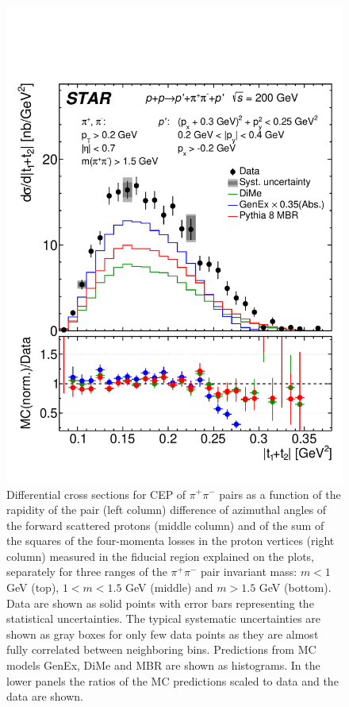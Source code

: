 \begin{figure}[h]
\hfill
\includegraphics[width=.31\textwidth,page=1]{graphics/physicsResults/Ratio_FinalResult_MandelstamTSum_pion_MassBin_3.pdf}
%
\caption{Differential cross sections for CEP of $\pi^+\pi^-$ pairs as a function of the rapidity of the pair (left column) difference of azimuthal angles of the forward scattered protons (middle column) and of the sum of the squares of the four-momenta losses in the proton vertices (right column) measured in the fiducial region explained on the plots, separately for three ranges of the $\pi^+\pi^-$ pair invariant mass: $m<1$ GeV (top), $1<m<1.5$ GeV (middle) and $m>1.5$ GeV (bottom). Data are shown as solid points with error bars representing the statistical uncertainties. The typical systematic uncertainties are shown as gray boxes for only few data points as they are almost fully correlated between neighboring bins. Predictions from MC models GenEx, DiMe and MBR are shown as histograms. In the lower panels the ratios of the MC predictions scaled to data and the data are shown.}
\label{results_4}
\end{figure}
%
%
